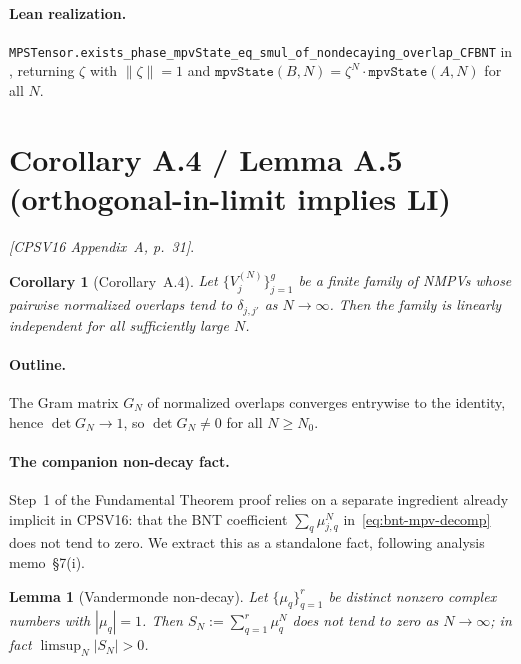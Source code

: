 \documentclass{article}
\newcommand{\leanid}[1]{\texttt{#1}}
\newcommand{\paperref}[1]{\textit{[CPSV16 #1]}}
\theoremstyle{plain}
\newtheorem{lemma}{Lemma}
\newtheorem{corollary}{Corollary}
\begin{document}
\paragraph{Lean realization.}
\leanid{MPSTensor.exists\_phase\_mpvState\_eq\_smul\_of\_nondecaying\_overlap\_CFBNT}
in , returning $\zeta$ with
$\|\zeta\| = 1$ and $\leanid{mpvState}(B,N) = \zeta^N \cdot
    \leanid{mpvState}(A,N)$ for all $N$.

\section{Corollary A.4 / Lemma A.5 (orthogonal-in-limit implies LI)}
\label{sec:lemma-A4}

\paperref{Appendix~A, p.~31}.

\begin{corollary}[Corollary~A.4]
    Let $\{V_j^{(N)}\}_{j=1}^{g}$ be a finite family of NMPVs whose pairwise
    normalized overlaps tend to $\delta_{j,j'}$ as $N \to \infty$. Then the
    family is linearly independent for all sufficiently large $N$.
\end{corollary}

\paragraph{Outline.}
The Gram matrix $G_N$ of normalized overlaps converges entrywise to the
identity, hence $\det G_N \to 1$, so $\det G_N \neq 0$ for all $N \ge N_0$.

\paragraph{The companion non-decay fact.}
Step~1 of the Fundamental Theorem proof relies on a separate ingredient
already implicit in CPSV16: that the BNT coefficient $\sum_q \mu_{j,q}^N$
in~\eqref{eq:bnt-mpv-decomp} does not tend to zero. We extract this as a
standalone fact, following analysis memo~\S7(i).

\begin{lemma}[Vandermonde non-decay]
    \label{lem:vandermonde-non-decay}
    Let $\{\mu_q\}_{q=1}^{r}$ be distinct nonzero complex numbers with
    $|\mu_q| = 1$. Then $S_N := \sum_{q=1}^{r} \mu_q^N$ does not tend to
    zero as $N \to \infty$; in fact $\limsup_N |S_N| > 0$.
\end{lemma}
\end{document}
